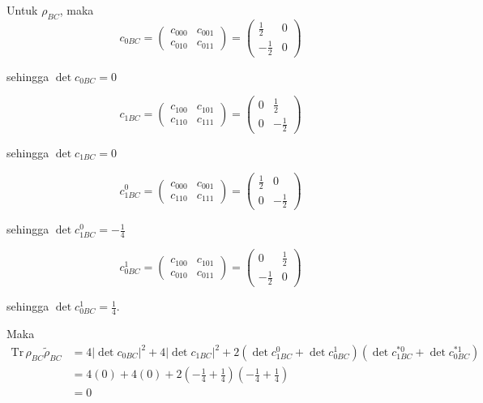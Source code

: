 Untuk $\rho_{BC}$, maka
\begin{equation}
	c_{0BC}=
	\begin{pmatrix}
		c_{000} & c_{001} \\
		c_{010} & c_{011}
	\end{pmatrix}=
	\begin{pmatrix}
		\frac{1}{2} & 0 \\
		-\frac{1}{2} & 0
	\end{pmatrix}
\end{equation}

sehingga $\det c_{0BC} = 0$

\begin{equation}
	c_{1BC}=
	\begin{pmatrix}
		c_{100} & c_{101} \\
		c_{110} & c_{111}
	\end{pmatrix}=
	\begin{pmatrix}
		0 & \frac{1}{2} \\
		0 & -\frac{1}{2}
	\end{pmatrix}
\end{equation}

sehingga $\det c_{1BC} = 0$

\begin{equation}
	c_{1BC}^0=
	\begin{pmatrix}
		c_{000} & c_{001} \\
		c_{110} & c_{111}
	\end{pmatrix}=
	\begin{pmatrix}
		\frac{1}{2} & 0 \\
		0 & -\frac{1}{2}
	\end{pmatrix}
\end{equation}

sehingga $\det c_{1BC}^0 = -\frac{1}{4}$

\begin{equation}
	c_{0BC}^1=
	\begin{pmatrix}
		c_{100} & c_{101} \\
		c_{010} & c_{011}
	\end{pmatrix}=
	\begin{pmatrix}
		0 & \frac{1}{2} \\
		-\frac{1}{2} & 0
	\end{pmatrix}
\end{equation}

sehingga $\det c_{0BC}^1 = \frac{1}{4}$.

Maka
\begin{equation}
	\begin{aligned}
		\mathrm{Tr}\,\rho_{BC}\tilde{\rho}_{BC}
		&=4|\det c_{0BC}|^2+4|\det c_{1BC}|^2+2(\det c_{1BC}^0+ \det c_{0BC}^1)(\det c^{*0}_{1BC} + \det c^{*1}_{0BC})\\
		&=4(0)+4(0)+2(-\frac{1}{4}+\frac{1}{4})(-\frac{1}{4}+\frac{1}{4})\\
		&=0
	\end{aligned}
\end{equation}

